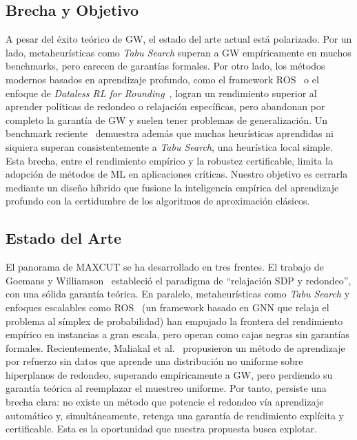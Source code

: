 \documentclass{article}
\begin{document}
\subsection{Brecha y Objetivo}

A pesar del éxito teórico de GW, el estado del arte actual está polarizado. Por un lado, metaheurísticas como \textit{Tabu Search} superan a GW empíricamente en muchos benchmarks, pero carecen de garantías formales. Por otro lado, los métodos modernos basados en aprendizaje profundo, como el framework ROS~\cite{qiu2025rosgnnbasedrelaxoptimizeandsampleframework} o el enfoque de \textit{Dataless RL for Rounding}~\cite{maliakal2025datalessreinforcementlearningapproach}, logran un rendimiento superior al aprender políticas de redondeo o relajación específicas, pero abandonan por completo la garantía de GW y suelen tener problemas de generalización. Un benchmark reciente~\cite{nath2024benchmarkmaximumcutstandardization} demuestra además que muchas heurísticas aprendidas ni siquiera superan consistentemente a \textit{Tabu Search}, una heurística local simple. Esta brecha, entre el rendimiento empírico y la robustez certificable, limita la adopción de métodos de ML en aplicaciones críticas. Nuestro objetivo es cerrarla mediante un diseño híbrido que fusione la inteligencia empírica del aprendizaje profundo con la certidumbre de los algoritmos de aproximación clásicos.

\subsection{Estado del Arte}

El panorama de MAXCUT se ha desarrollado en tres frentes. El trabajo de Goemans y Williamson~\cite{goemans1995} estableció el paradigma de ``relajación SDP y redondeo'', con una sólida garantía teórica. En paralelo, metaheurísticas como \textit{Tabu Search} y enfoques escalables como ROS~\cite{qiu2025rosgnnbasedrelaxoptimizeandsampleframework} (un framework basado en GNN que relaja el problema al símplex de probabilidad) han empujado la frontera del rendimiento empírico en instancias a gran escala, pero operan como cajas negras sin garantías formales. Recientemente, Maliakal et al.~\cite{maliakal2025datalessreinforcementlearningapproach} propusieron un método de aprendizaje por refuerzo sin datos que aprende una distribución no uniforme sobre hiperplanos de redondeo, superando empíricamente a GW, pero perdiendo su garantía teórica al reemplazar el muestreo uniforme. Por tanto, persiste una brecha clara: no existe un método que potencie el redondeo vía aprendizaje automático y, simultáneamente, retenga una garantía de rendimiento explícita y certificable. Esta es la oportunidad que nuestra propuesta busca explotar.
\end{document}
